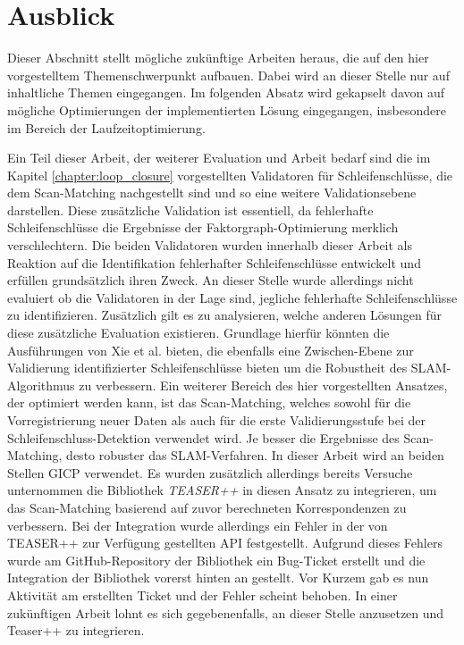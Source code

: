 \section{Ausblick}

Dieser Abschnitt stellt mögliche zukünftige Arbeiten heraus, die auf den hier vorgestelltem Themenschwerpunkt aufbauen. Dabei wird an dieser Stelle nur auf inhaltliche Themen eingegangen. Im folgenden Absatz wird gekapselt davon auf mögliche Optimierungen der implementierten Lösung eingegangen, insbesondere im Bereich der Laufzeitoptimierung.

Ein Teil dieser Arbeit, der weiterer Evaluation und Arbeit bedarf sind die im Kapitel \ref{chapter:loop_closure} vorgestellten Validatoren für Schleifenschlüsse, die dem Scan-Matching nachgestellt sind und so eine weitere Validationsebene darstellen. Diese zusätzliche Validation ist essentiell, da fehlerhafte Schleifenschlüsse die Ergebnisse der Faktorgraph-Optimierung merklich verschlechtern. Die beiden Validatoren wurden innerhalb dieser Arbeit als Reaktion auf die Identifikation fehlerhafter Schleifenschlüsse entwickelt und erfüllen grundsätzlich ihren Zweck. An dieser Stelle wurde allerdings nicht evaluiert ob die Validatoren in der Lage sind, jegliche fehlerhafte Schleifenschlüsse zu identifizieren. Zusätzlich gilt es zu analysieren, welche anderen Lösungen für diese zusätzliche Evaluation existieren. Grundlage hierfür könnten die Ausführungen von Xie et al. bieten, die ebenfalls eine Zwischen-Ebene zur Validierung identifizierter Schleifenschlüsse bieten um die Robustheit des SLAM-Algorithmus zu verbessern.
Ein weiterer Bereich des hier vorgestellten Ansatzes, der optimiert werden kann, ist das Scan-Matching, welches sowohl für die Vorregistrierung neuer Daten als auch für die erste Validierungsstufe bei der Schleifenschluss-Detektion verwendet wird. Je besser die Ergebnisse des Scan-Matching, desto robuster das SLAM-Verfahren. In dieser Arbeit wird an beiden Stellen GICP verwendet. Es wurden zusätzlich allerdings bereits Versuche unternommen die Bibliothek \emph{TEASER++} \cite{Yang20tro-teaser} in diesen Ansatz zu integrieren, um das Scan-Matching basierend auf zuvor berechneten Korrespondenzen zu verbessern. Bei der Integration wurde allerdings ein Fehler in der von TEASER++ zur Verfügung gestellten API festgestellt. Aufgrund dieses Fehlers wurde am GitHub-Repository der Bibliothek ein Bug-Ticket erstellt und die Integration der Bibliothek vorerst hinten an gestellt. Vor Kurzem gab es nun Aktivität am erstellten Ticket und der Fehler scheint behoben. In einer zukünftigen Arbeit lohnt es sich gegebenenfalls, an dieser Stelle anzusetzen und Teaser++ zu integrieren.
